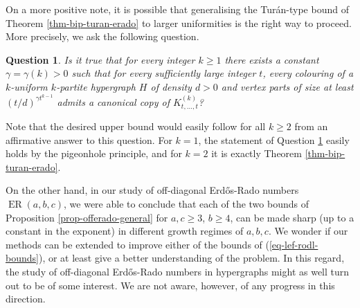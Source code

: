 \documentclass[10pt,a4paper]{article}
\theoremstyle{plain}
\newtheorem{question}[theorem]{Question}
\theoremstyle{definition}
\newcommand{\offerado}[3]{\operatorname{ER}(#1,#2,#3)}
\newcommand{\cmpltt}[3]{K^{(#1)}_{#2,\dots,#3}}
\newcommand{\cmplt}[2]{\cmpltt{#1}{#2}{#2}}
\begin{document}
On a more positive note, it is possible that generalising the Tur\'an-type bound of Theorem \ref{thm-bip-turan-erado} to larger uniformities is the right way to proceed. More precisely, we ask the following question.

\begin{question}\label{qst-turan}
    Is it true that for every integer $k\ge 1$ there exists a constant $\gamma=\gamma(k)>0$ such that for every sufficiently large integer $t$, every colouring of a $k$-uniform $k$-partite hypergraph $H$ of density $d>0$ and vertex parts of size at least $(t/d)^{\gamma t^{k-1}}$ admits a canonical copy of $\cmplt{k}{t}$?
\end{question}

Note that the desired upper bound would easily follow for all $k\ge 2$ from an affirmative answer to this question. For $k=1$, the statement of Question \ref{qst-turan} easily holds by the pigeonhole principle, and for $k=2$ it is exactly Theorem \ref{thm-bip-turan-erado}.

On the other hand, in our study of off-diagonal Erd\H{o}s-Rado numbers $\offerado{a}{b}{c}$, we were able to conclude that each of the two bounds of Proposition \ref{prop-offerado-general} for $a,c\ge 3$, $b\ge4$, can be made sharp (up to a constant in the exponent) in different growth regimes of $a,b,c$. We wonder if our methods can be extended to improve either of the bounds of (\ref{eq-lef-rodl-bounds}), or at least give a better understanding of the problem. In this regard, the study of off-diagonal Erd\H{o}s-Rado numbers in hypergraphs might as well turn out to be of some interest. We are not aware, however, of any progress in this direction.
\end{document}
